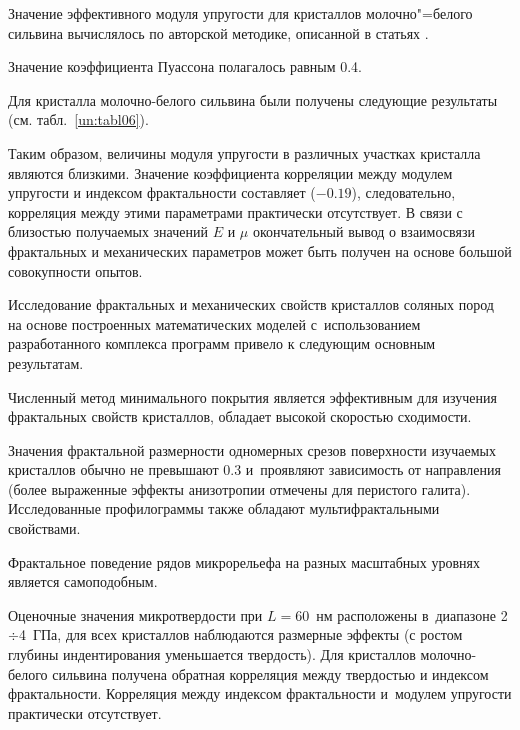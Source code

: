 Значение эффективного модуля упругости для кристаллов молочно"=белого сильвина вычислялось по авторской методике, описанной в статьях \cite{l2,l4}. 

Значение коэффициента Пуассона полагалось равным 0.4. 

Для кристалла молочно-белого сильвина были получены следующие результаты (см. табл.~\ref{un:tabl06}). 



Таким образом, величины модуля упругости в различных участках кристалла являются близкими. Значение коэффициента корреляции между модулем упругости и индексом фрактальности составляет ($-0.19$),  следовательно, корреляция между этими параметрами практически отсутствует.  В связи с близостью получаемых значений $E$ и $\mu$  окончательный вывод о взаимосвязи фрактальных и механических параметров может быть получен на основе большой совокупности опытов.



\smallskip




Исследование фрактальных и механических свойств кристаллов соляных пород на основе построенных математических моделей с~использованием разработанного комплекса программ привело к следующим основным результатам. 

Численный метод минимального покрытия является эффективным для изучения фрактальных свойств кристаллов, обладает высокой скоростью сходимости. 

Значения фрактальной размерности одномерных срезов поверхности изучаемых кристаллов обычно не превышают 0.3 и~проявляют зависимость от направления (более выраженные эффекты анизотропии отмечены для перистого галита). Исследованные профилограммы также обладают мультифрактальными свойствами. 

Фрактальное поведение рядов микрорельефа на разных масштабных уровнях является самоподобным. 

Оценочные значения микротвердости при $L=60$~нм расположены в~диапазоне 2${\div}$4~ГПа, для всех кристаллов наблюдаются размерные эффекты (с ростом глубины индентирования уменьшается твердость). Для кристаллов молочно-белого сильвина получена обратная корреляция между твердостью и индексом фрактальности. Корреляция между индексом фрактальности и~модулем упругости практически отсутствует.






